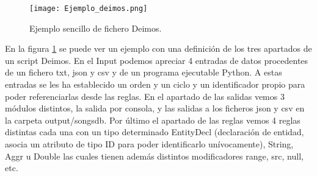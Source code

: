 \begin{figure}[h!]
	\centerline{\texttt{[image: Ejemplo\_deimos.png]}}
	\caption{Ejemplo sencillo de fichero Deimos.}
	\label{figure:deimosexample}
\end{figure}

En la figura \ref{figure:deimosexample} se puede ver un ejemplo con una definición de los tres apartados de un script Deimos. En el Input podemos apreciar 4 entradas de datos procedentes de un fichero txt, json y csv y de un programa ejecutable Python. A estas entradas se les ha establecido un orden y un ciclo y un identificador propio para poder referenciarlas desde las reglas. En el apartado de las salidas vemos 3 módulos distintos, la salida por consola, y las salidas a los ficheros json y csv en la carpeta output/songsdb. Por último el apartado de las reglas vemos 4 reglas distintas cada una con un tipo determinado EntityDecl (declaración de entidad, asocia un atributo de tipo ID para poder identificarlo unívocamente), String, Aggr u Double las cuales tienen además distintos modificadores range, src, null, etc.







